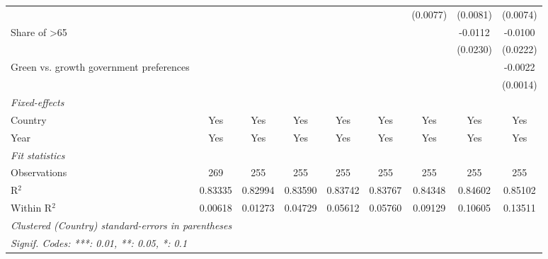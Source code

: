 \begin{table}[htbp]
\begin{tabular}{lcccccccc}
                                                  &          &          &          &          &          & (0.0077) & (0.0081)               & (0.0074)\\   
      Share of >65                                &          &          &          &          &          &          & -0.0112                & -0.0100\\   
                                                  &          &          &          &          &          &          & (0.0230)               & (0.0222)\\   
      Green vs. growth government preferences     &          &          &          &          &          &          &                        & -0.0022\\   
                                                  &          &          &          &          &          &          &                        & (0.0014)\\   
      \midrule
      \emph{Fixed-effects}\\
      Country                                     & Yes      & Yes      & Yes      & Yes      & Yes      & Yes      & Yes                    & Yes\\  
      Year                                        & Yes      & Yes      & Yes      & Yes      & Yes      & Yes      & Yes                    & Yes\\  
      \midrule
      \emph{Fit statistics}\\
      Observations                                & 269      & 255      & 255      & 255      & 255      & 255      & 255                    & 255\\  
      R$^2$                                       & 0.83335  & 0.82994  & 0.83590  & 0.83742  & 0.83767  & 0.84348  & 0.84602                & 0.85102\\  
      Within R$^2$                                & 0.00618  & 0.01273  & 0.04729  & 0.05612  & 0.05760  & 0.09129  & 0.10605                & 0.13511\\  
      \midrule \midrule
      \multicolumn{9}{l}{\emph{Clustered (Country) standard-errors in parentheses}}\\
      \multicolumn{9}{l}{\emph{Signif. Codes: ***: 0.01, **: 0.05, *: 0.1}}\\
   \end{tabular}
\end{table}



